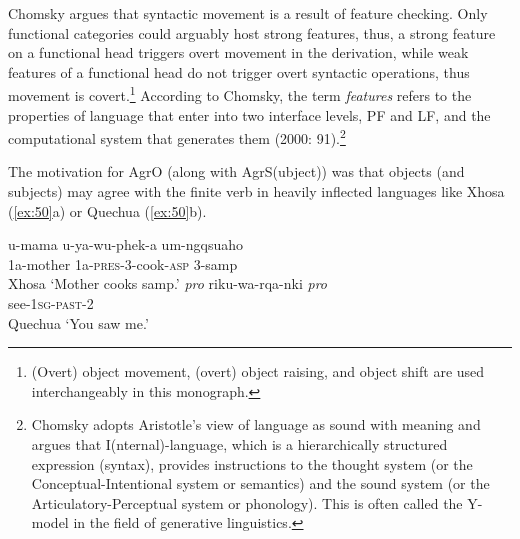 Chomsky argues that syntactic movement is a result of feature checking. Only functional categories could arguably host strong features, thus, a strong feature on a functional head triggers overt movement in the derivation, while weak features of a functional head do not trigger overt syntactic operations, thus movement is covert.\footnote{\textrm{(Overt) object movement, (overt) object raising, and object shift are used interchangeably in this monograph.}} According to Chomsky, the term \textit{features} refers to the properties of language that enter into two interface levels, \acf{PF} and \acf{LF}, and the computational system that generates them (2000: 91).\footnote{\textrm{Chomsky adopts Aristotle’s view of language as sound with meaning and argues that I(nternal)-language, which is a hierarchically structured expression (syntax), provides instructions to the thought system (or the Conceptual-Intentional system or semantics) and the sound system (or the Articulatory-Perceptual system or phonology). This is often called the Y-model in the field of generative linguistics.} } 


The motivation for AgrO (along with AgrS(ubject)) was that objects (and subjects) may agree with the finite verb in heavily inflected languages like Xhosa (\ref{ex:50}a) or Quechua (\ref{ex:50}b).

\ea\label{ex:50}\ea
\gll u-mama  u-ya-wu-phek-a  um-ngqsuaho \\
1a-mother  1a-\textsc{pres}-3-cook-\textsc{asp}  3-samp \\
\hfill Xhosa
\glt  ‘Mother cooks samp.’
\ex \gll \textit{pro}  riku-wa-rqa-nki  \textit{pro} \\
{} see-1\textsc{sg}-\textsc{past}-2 {}
\\
\hfill Quechua
\glt `You saw me.' \citep{DenDikken2016}
\z
\z

